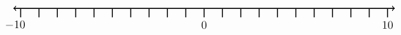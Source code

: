 \documentclass[leqno, 12pt]{article}
\begin{document}
\vspace{10pt}\begin{equation}
    \begin{tikzpicture}[scale=0.67, baseline={([yshift=-1pt]current bounding box.north)}]
        \draw[{To[scale=1.3]}-{To[scale=1.3]}, line width=1pt] (-10.4, 0) -- (10.4, 0);
        \foreach \x in {-10,-9,...,10}
            \draw[shift={(\x,0)},color=black, line width=1pt] (0pt,-14pt) -- (0pt,0pt);
        \foreach \x in {-10}
            \draw[shift={(\x -0.3,-0.8)},color=black] node[font=\large,text height=12pt] {$\x$};
        \foreach \x in {0,10}
            \draw[shift={(\x,-0.8)},color=black] node[font=\large,text height=12pt] {$\x$};
        \node [font=\large, anchor=east] at (15,1.65){$  $};
    \end{tikzpicture}
\end{equation}
\vspace{10pt}
\end{document}
